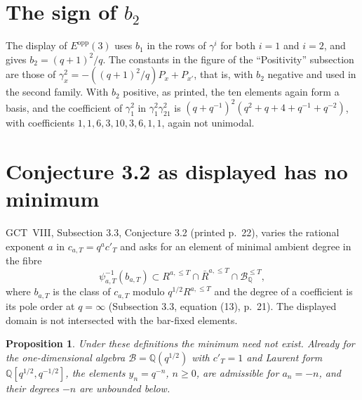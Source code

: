 \documentclass[11pt,a4paper]{article}
\newcommand{\Q}{\mathbb{Q}}
\newtheorem{proposition}{Proposition}
\theoremstyle{definition}
\begin{document}
\section{The sign of \texorpdfstring{$b_2$}{b2}}\label{sec:b2}

The display of $E^{\mathrm{opp}}(3)$ uses $b_1$ in the rows of $\gamma^i$ for
both $i=1$ and $i=2$, and gives $b_2=(q+1)^2/q$. The constants in the figure of
the ``Positivity'' subsection are those of
$\gamma^2_x=-((q+1)^2/q)P_x+P_{x'}$, that is, with $b_2$ negative and used in
the second family. With $b_2$ positive, as printed, the ten elements again form
a basis, and the coefficient of $\gamma^2_1$ in $\gamma^2_1\gamma^2_{21}$ is
$(q+q^{-1})^2(q^2+q+4+q^{-1}+q^{-2})$, with coefficients
$1,1,6,3,10,3,6,1,1$, again not unimodal.

\section{Conjecture 3.2 as displayed has no minimum}

GCT~VIII, Subsection 3.3, Conjecture 3.2 (printed p.~22), varies the rational
exponent $a$ in $c_{a,T}=q^ac'_T$ and asks for an element of minimal ambient
degree in the fibre
\[
 \psi_{a,T}^{-1}(b_{a,T})\subset R^{a,\le T}\cap\bar R^{a,\le T}\cap
 \mathcal B^{\le T}_{\Q},
\]
where $b_{a,T}$ is the class of $c_{a,T}$ modulo $q^{1/2}R^{a,\le T}$ and the
degree of a coefficient is its pole order at $q=\infty$ (Subsection 3.3,
equation (13), p.~21). The displayed domain is not intersected with the
bar-fixed elements.

\begin{proposition}
Under these definitions the minimum need not exist. Already for the
one-dimensional algebra $\mathcal B=\Q(q^{1/2})$ with $c'_T=1$ and Laurent form
$\Q[q^{1/2},q^{-1/2}]$, the elements $y_n=q^{-n}$, $n\ge0$, are admissible for
$a_n=-n$, and their degrees $-n$ are unbounded below.
\end{proposition}
\end{document}
